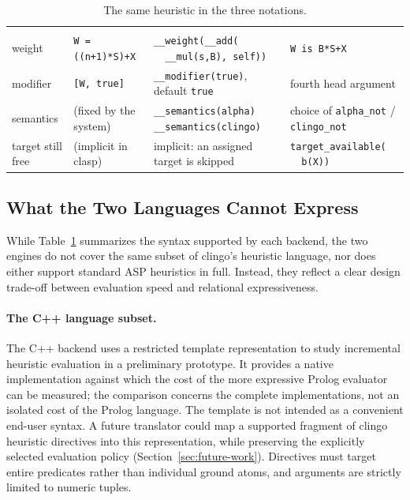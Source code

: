 \begin{table}[H]
\begin{tabular}{@{}>{\raggedright\arraybackslash}p{2.1cm}>{\raggedright\arraybackslash}p{3.3cm}>{\raggedright\arraybackslash}p{3.9cm}>{\raggedright\arraybackslash}p{3.9cm}@{}}
\addlinespace[4pt]
\midrule
\multicolumn{4}{@{}l}{\emph{annotations}}\\
\addlinespace[2pt]
weight & \texttt{W = ((n+1)*S)+X} & \texttt{\_\_weight(\_\_add(} \newline \texttt{\ \ \_\_mul(s,B), self))} & \texttt{W is B*S+X}\\
\addlinespace[3pt]
modifier & \texttt{[W, true]} & \texttt{\_\_modifier(true)}, \newline default \texttt{true} & fourth head argument\\
\addlinespace[3pt]
semantics & (fixed by the system) & \texttt{\_\_semantics(alpha)} \newline \texttt{\_\_semantics(clingo)} & choice of \texttt{alpha\_not} / \texttt{clingo\_not}\\
\addlinespace[3pt]
target still free & (implicit in clasp) & implicit: an assigned target is skipped & \texttt{target\_available(} \newline \texttt{\ \ b(X))}\\
\bottomrule
\end{tabular}
\caption{The same heuristic in the three notations.}
\label{tab:translation}
\end{table}

\subsection{What the Two Languages Cannot Express}
\label{sec:dsl-limits}

While Table~\ref{tab:translation} summarizes the syntax supported by each backend, the two engines do not cover the same subset of clingo's heuristic language, nor does either support standard ASP heuristics in full. Instead, they reflect a clear design trade-off between evaluation speed and relational expressiveness.

\paragraph{The C++ language subset.}
The C++ backend uses a restricted template representation to study incremental heuristic evaluation in a preliminary prototype. It provides a native implementation against which the cost of the more expressive Prolog evaluator can be measured; the comparison concerns the complete implementations, not an isolated cost of the Prolog language. The template is not intended as a convenient end-user syntax. A future translator could map a supported fragment of clingo heuristic directives into this representation, while preserving the explicitly selected evaluation policy (Section~\ref{sec:future-work}). Directives must target entire predicates rather than individual ground atoms, and arguments are strictly limited to numeric tuples.

